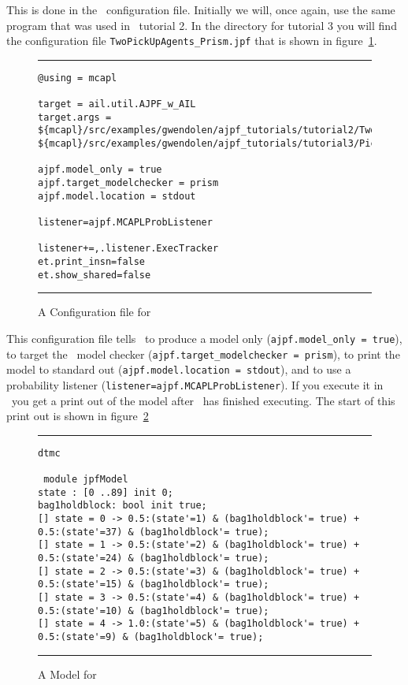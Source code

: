 This is done in the \ajpf\ configuration file.  Initially we will, once again, use the same program that was used in \ajpf\ tutorial 2.  In the directory for tutorial 3 you will find the configuration file \texttt{TwoPickUpAgents\_Prism.jpf} that is shown in figure~\ref{fig:prism_config1}.

\begin{figure}[htb]
\noindent\rule{\textwidth}{1pt}
\begin{small}
\begin{verbatim}
@using = mcapl

target = ail.util.AJPF_w_AIL
target.args = ${mcapl}/src/examples/gwendolen/ajpf_tutorials/tutorial2/TwoPickUpAgents.ail,
${mcapl}/src/examples/gwendolen/ajpf_tutorials/tutorial3/PickUpAgent.psl,1

ajpf.model_only = true
ajpf.target_modelchecker = prism
ajpf.model.location = stdout

listener=ajpf.MCAPLProbListener

listener+=,.listener.ExecTracker
et.print_insn=false
et.show_shared=false
\end{verbatim}
\end{small}
\rule{\textwidth}{1pt}
\caption{A Configuration file for \prism}
\label{fig:prism_config1}
\end{figure}

This configuration file tells \ajpf\ to produce a model only (\texttt{ajpf.model\_only = true}), to target the \prism\ model checker (\texttt{ajpf.target\_modelchecker = prism}), to print the model to standard out (\texttt{ajpf.model.location = stdout}), and to use a probability listener (\texttt{listener=ajpf.MCAPLProbListener}).  If you execute it in \ajpf\ you get a print out of the model after \ajpf\  has finished executing.  The start of this print out is shown in figure~\ref{fig:prism_output1}

\begin{figure}[htb]
\noindent\rule{\textwidth}{1pt}
\begin{small}
\begin{verbatim}
dtmc

 module jpfModel
state : [0 ..89] init 0;
bag1holdblock: bool init true;
[] state = 0 -> 0.5:(state'=1) & (bag1holdblock'= true) + 0.5:(state'=37) & (bag1holdblock'= true);
[] state = 1 -> 0.5:(state'=2) & (bag1holdblock'= true) + 0.5:(state'=24) & (bag1holdblock'= true);
[] state = 2 -> 0.5:(state'=3) & (bag1holdblock'= true) + 0.5:(state'=15) & (bag1holdblock'= true);
[] state = 3 -> 0.5:(state'=4) & (bag1holdblock'= true) + 0.5:(state'=10) & (bag1holdblock'= true);
[] state = 4 -> 1.0:(state'=5) & (bag1holdblock'= true) + 0.5:(state'=9) & (bag1holdblock'= true);
\end{verbatim}
\end{small}
\rule{\textwidth}{1pt}
\caption{A Model for \prism}
\label{fig:prism_output1}
\end{figure}

